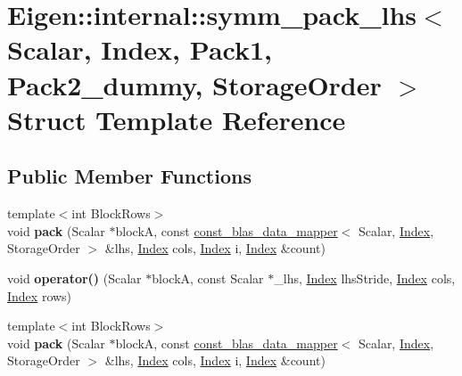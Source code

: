 \hypertarget{struct_eigen_1_1internal_1_1symm__pack__lhs}{}\section{Eigen\+:\+:internal\+:\+:symm\+\_\+pack\+\_\+lhs$<$ Scalar, Index, Pack1, Pack2\+\_\+dummy, Storage\+Order $>$ Struct Template Reference}
\label{struct_eigen_1_1internal_1_1symm__pack__lhs}
\subsection*{Public Member Functions}
\begin{DoxyCompactItemize}
\item 
\mbox{\label{struct_eigen_1_1internal_1_1symm__pack__lhs_aad8bf0f72a54a95ee37e79f74c603fd5}} 
{\footnotesize template$<$int Block\+Rows$>$ }\\void {\bfseries pack} (Scalar $\ast$blockA, const \hyperlink{class_eigen_1_1internal_1_1const__blas__data__mapper}{const\+\_\+blas\+\_\+data\+\_\+mapper}$<$ Scalar, \hyperlink{namespace_eigen_a62e77e0933482dafde8fe197d9a2cfde}{Index}, Storage\+Order $>$ \&lhs, \hyperlink{namespace_eigen_a62e77e0933482dafde8fe197d9a2cfde}{Index} cols, \hyperlink{namespace_eigen_a62e77e0933482dafde8fe197d9a2cfde}{Index} i, \hyperlink{namespace_eigen_a62e77e0933482dafde8fe197d9a2cfde}{Index} \&count)
\item 
\mbox{\label{struct_eigen_1_1internal_1_1symm__pack__lhs_ae6a09da9a1adb8a1d9d0f3dc3c632d2e}} 
void {\bfseries operator()} (Scalar $\ast$blockA, const Scalar $\ast$\+\_\+lhs, \hyperlink{namespace_eigen_a62e77e0933482dafde8fe197d9a2cfde}{Index} lhs\+Stride, \hyperlink{namespace_eigen_a62e77e0933482dafde8fe197d9a2cfde}{Index} cols, \hyperlink{namespace_eigen_a62e77e0933482dafde8fe197d9a2cfde}{Index} rows)
\item 
\mbox{\label{struct_eigen_1_1internal_1_1symm__pack__lhs_aad8bf0f72a54a95ee37e79f74c603fd5}} 
{\footnotesize template$<$int Block\+Rows$>$ }\\void {\bfseries pack} (Scalar $\ast$blockA, const \hyperlink{class_eigen_1_1internal_1_1const__blas__data__mapper}{const\+\_\+blas\+\_\+data\+\_\+mapper}$<$ Scalar, \hyperlink{namespace_eigen_a62e77e0933482dafde8fe197d9a2cfde}{Index}, Storage\+Order $>$ \&lhs, \hyperlink{namespace_eigen_a62e77e0933482dafde8fe197d9a2cfde}{Index} cols, \hyperlink{namespace_eigen_a62e77e0933482dafde8fe197d9a2cfde}{Index} i, \hyperlink{namespace_eigen_a62e77e0933482dafde8fe197d9a2cfde}{Index} \&count)

\end{DoxyCompactItemize}
